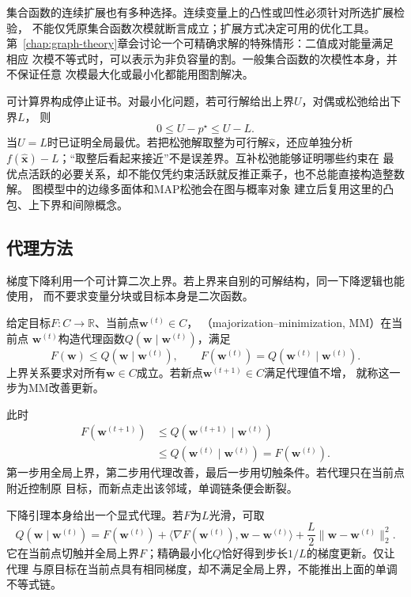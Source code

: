 集合函数的连续扩展也有多种选择。连续变量上的凸性或凹性必须针对所选扩展检验，
不能仅凭原集合函数次模就断言成立；扩展方式决定可用的优化工具。
第~\ref{chap:graph-theory}章会讨论一个可精确求解的特殊情形：二值成对能量满足相应
次模不等式时，可以表示为非负容量的割。一般集合函数的次模性本身，并不保证任意
次模最大化或最小化都能用图割解决。

可计算界构成停止证书。对最小化问题，若可行解给出上界$U$，对偶或松弛给出下界$L$，
则
\[
  0\leq U-p^\star\leq U-L.
\]
当$U=L$时已证明全局最优。若把松弛解取整为可行解$\widehat{\bm{x}}$，还应单独分析
$f(\widehat{\bm{x}})-L$；“取整后看起来接近”不是误差界。互补松弛能够证明哪些约束在
最优点活跃的必要关系，却不能仅凭约束活跃就反推正乘子，也不总能直接构造整数解。
图模型中的边缘多面体和MAP松弛会在图与概率对象
建立后复用这里的凸包、上下界和间隙概念。

\subsection{代理方法}
\label{sec:opt-majorization-improvement}

梯度下降利用一个可计算二次上界。若上界来自别的可解结构，同一下降逻辑也能使用，
而不要求变量分块或目标本身是二次函数。
\begin{definition}[主化代理与MM更新]
\label{def:opt-majorization-minimization}
给定目标$F:C\to\mathbb R$、当前点$\bm w^{(t)}\in C$，
（majorization--minimization, MM）在当前点
$\bm{w}^{(t)}$构造代理函数$Q(\bm{w}\mid\bm{w}^{(t)})$，满足
\[
  F(\bm{w})\leq Q(\bm{w}\mid\bm{w}^{(t)}),
  \qquad
  F(\bm{w}^{(t)})=Q(\bm{w}^{(t)}\mid\bm{w}^{(t)}).
\]
上界关系要求对所有$\bm w\in C$成立。若新点$\bm w^{(t+1)}\in C$满足代理值不增，
就称这一步为MM改善更新。
\end{definition}
此时
\begin{align*}
  F(\bm{w}^{(t+1)})
  &\leq Q(\bm{w}^{(t+1)}\mid\bm{w}^{(t)})\\
  &\leq Q(\bm{w}^{(t)}\mid\bm{w}^{(t)})
  =F(\bm{w}^{(t)}).
\end{align*}
第一步用全局上界，第二步用代理改善，最后一步用切触条件。若代理只在当前点附近控制原
目标，而新点走出该邻域，单调链条便会断裂。

下降引理本身给出一个显式代理。若$F$为$L$光滑，可取
\[
  Q(\bm{w}\mid\bm{w}^{(t)})
  =F(\bm{w}^{(t)})
  +\langle\nabla F(\bm{w}^{(t)}),\bm{w}-\bm{w}^{(t)}\rangle
  +\frac{L}{2}\lVert\bm{w}-\bm{w}^{(t)}\rVert_2^2.
\]
它在当前点切触并全局上界$F$；精确最小化$Q$恰好得到步长$1/L$的梯度更新。仅让代理
与原目标在当前点具有相同梯度，却不满足全局上界，不能推出上面的单调不等式链。

